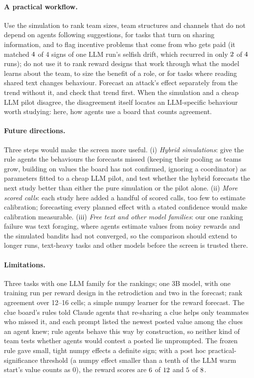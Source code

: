 \documentclass{article}
\begin{document}
\paragraph{A practical workflow.} Use the simulation to rank team sizes, team structures and channels that do not depend on agents following suggestions, for tasks that turn on sharing information, and to flag incentive problems that come from who gets paid (it matched $4$ of 4 signs of one LLM run's selfish drift, which recurred in only $2$ of $4$ runs); do not use it to rank reward designs that work through what the model learns about the team, to size the benefit of a role, or for tasks where reading shared text changes behaviour. Forecast an attack's effect separately from the trend without it, and check that trend first. When the simulation and a cheap LLM pilot disagree, the disagreement itself locates an LLM-specific behaviour worth studying: here, how agents use a board that counts agreement.

\paragraph{Future directions.} Three steps would make the screen more useful. (i) \emph{Hybrid simulations}: give the rule agents the behaviours the forecasts missed (keeping their pooling as teams grow, building on values the board has not confirmed, ignoring a coordinator) as parameters fitted to a cheap LLM pilot, and test whether the hybrid forecasts the next study better than either the pure simulation or the pilot alone. (ii) \emph{More scored calls}: each study here added a handful of scored calls, too few to estimate calibration; forecasting every planned effect with a stated confidence would make calibration measurable. (iii) \emph{Free text and other model families}: our one ranking failure was text foraging, where agents estimate values from noisy rewards and the simulated bandits had not converged, so the comparison should extend to longer runs, text-heavy tasks and other models before the screen is trusted there.

\paragraph{Limitations.} Three tasks with one LLM family for the rankings; one 3B model, with one training run per reward design in the retrodiction and two in the forecast; rank agreement over 12--16 cells; a simple numpy learner for the reward forecast. The clue board's rules told Claude agents that re-sharing a clue helps only teammates who missed it, and each prompt listed the newest posted value among the clues an agent knew; rule agents behave this way by construction, so neither kind of team tests whether agents would contest a posted lie unprompted. The frozen rule gave small, tight numpy effects a definite sign; with a post hoc practical-significance threshold (a numpy effect smaller than a tenth of the LLM warm start's value counts as 0), the reward scores are $6$ of $12$ and $5$ of $8$.
\end{document}
